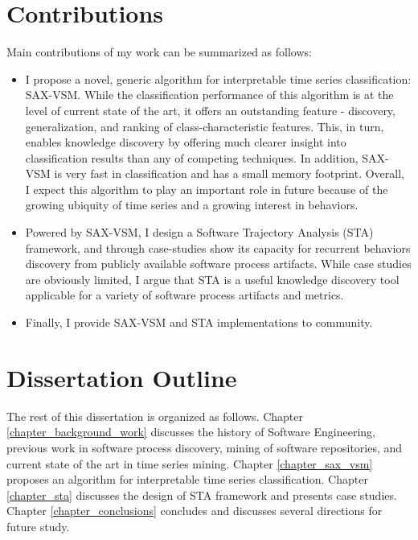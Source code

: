 \section{Contributions}\label{section_contributions}
Main contributions of my work can be summarized as follows: 
\begin{itemize}
\item I propose a novel, generic algorithm for interpretable time series classification: SAX-VSM. 
While the classification performance of this algorithm is at the level of current state of the art, 
it offers an outstanding feature - discovery, generalization, and ranking of class-characteristic features. 
This, in turn, enables knowledge discovery by offering much clearer insight into classification results than any of 
competing techniques.
In addition, SAX-VSM is very fast in classification and has a small memory footprint. 
Overall, I expect this algorithm to play an important role in future because of the growing ubiquity of time series and 
a growing interest in behaviors.
\item Powered by SAX-VSM, I design a Software Trajectory Analysis (STA) framework, and through case-studies 
show its capacity for recurrent behaviors discovery from publicly available software process
artifacts. While case studies are obviously limited, I argue that STA is a useful knowledge discovery tool applicable for a 
variety of software process artifacts and metrics. 
\item Finally, I provide SAX-VSM and STA implementations to community.
\end{itemize}

\section{Dissertation Outline}\label{section_organization}
The rest of this dissertation is organized as follows. Chapter \ref{chapter_background_work} discusses the history 
of Software Engineering, previous work in software process discovery, mining of software repositories, and current 
state of the art in time series mining. Chapter \ref{chapter_sax_vsm} proposes an algorithm for interpretable 
time series classification. Chapter \ref{chapter_sta} discusses the design of STA framework and presents case studies.
Chapter \ref{chapter_conclusions} concludes and discusses several directions for future study.